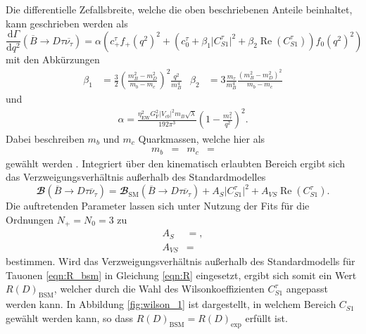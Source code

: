 Die differentielle Zefallsbreite, welche die oben beschriebenen Anteile beinhaltet, kann geschrieben werden als \cite{PhysRevD.88.094012}
\begin{equation}
  \label{eqn:wq_bsm}
  \frac{\mathrm{d} \Gamma}{\mathrm{d} q^2} \left(\overline{B} \to D \tau \overline{\nu_{\tau}} \right) = \alpha \left( c_+^{\tau} f_+(q^2)^2 + \left(c_0^{\tau} + \beta_1 \lvert C_{S1}^{\tau} \rvert^2 + \beta_2 \operatorname{Re}(C_{S1}^{\tau})\right) f_0(q^2)^2 \right)
\end{equation}
mit den Abkürzungen
\begin{align*}
  \beta_1 &= \frac{3}{2} \left( \frac{m_B^2 - m_D^2}{m_b - m_c} \right)^2 \frac{q^2}{m_B^4} & \beta_2 &= 3  \frac{m_\tau}{m_B^4} \frac{(m_B^2 - m_D^2)^2}{m_b - m_c}
\end{align*}
und
\begin{align*}
  \alpha = \frac{\eta_\text{EW}^2 G_\text{F}^2 \lvert V_{cb} \rvert^2 m_B \sqrt{\lambda} }{192 \pi^3} \left( 1 - \frac{m_\tau^2}{q^2} \right)^2.
\end{align*}
Dabei beschreiben $m_b$ und $m_c$ Quarkmassen, welche hier als 
\begin{align*}
  m_b &=  & m_c &= 
\end{align*}
gewählt werden \cite{Agashe:2014kda}.
Integriert über den kinematisch erlaubten Bereich ergibt sich das Verzweigungsverhältnis außerhalb des Standardmodelles
\begin{equation}
  \label{eqn:R_bsm}
  {\mathbfcal{B}}\!\left(\overline{B} \to D \tau \overline{\nu}_\tau \right) = {\mathbfcal{B}}_\text{SM}\!\left(\overline{B} \to D \tau \overline{\nu}_\tau \right) + A_S \lvert C_{S1}^{\tau} \rvert^2 + A_{VS} \operatorname{Re}(C_{S1}^{\tau}).
\end{equation}
Die auftretenden Parameter lassen sich unter Nutzung der Fits für die Ordnungen $N_+ = N_0 = \num{3}$ zu
\begin{align*}
  A_S &= , \\
  A_{VS} &= 
\end{align*}
bestimmen.
Wird das Verzweigungsverhältnis außerhalb des Standardmodells für Tauonen \eqref{eqn:R_bsm} in Gleichung \eqref{eqn:R} eingesetzt, ergibt sich somit ein Wert $R(D)_{\text{BSM}}$, welcher durch die Wahl des Wilsonkoeffizienten $C_{S1}^{\tau}$ angepasst werden kann.
In Abbildung \ref{fig:wilson_1} ist dargestellt, in welchem Bereich $C_{S1}$ gewählt werden kann, so dass $R(D)_{\text{BSM}} = R(D)_{\text{exp}}$ erfüllt ist.
